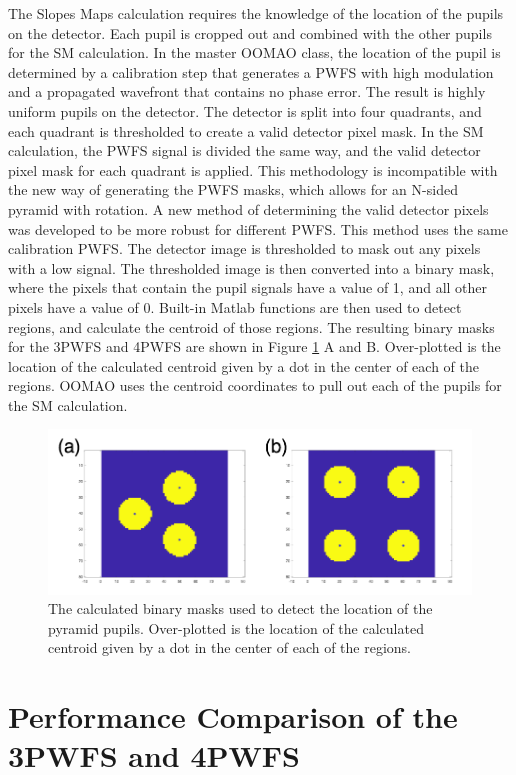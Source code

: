 The Slopes Maps calculation requires the knowledge of the location of the pupils on the detector. Each pupil is cropped out and combined with the other pupils for the SM calculation. In the master OOMAO class, the location of the pupil is determined by a calibration step that generates a PWFS with high modulation and a propagated wavefront that contains no phase error. The result is highly uniform pupils on the detector. The detector is split into four quadrants, and each quadrant is thresholded to create a valid detector pixel mask. In the SM calculation, the PWFS signal is divided the same way, and the valid detector pixel mask for each quadrant is applied. This methodology is incompatible with the new way of generating the PWFS masks, which allows for an N-sided pyramid with rotation. A new method of determining the valid detector pixels was developed to be more robust for different PWFS. This method uses the same calibration PWFS. The detector image is thresholded to mask out any pixels with a low signal. The thresholded image is then converted into a binary mask, where the pixels that contain the pupil signals have a value of 1, and all other pixels have a value of 0. Built-in Matlab functions are then used to detect regions, and calculate the centroid of those regions. The resulting binary masks for the 3PWFS and 4PWFS are shown in Figure \ref{fig:pyrcen} A and B. Over-plotted is the location of the calculated centroid given by a dot in the center of each of the regions. OOMAO uses the centroid coordinates to pull out each of the pupils for the SM calculation.

\begin{figure}
    \centering
    \includegraphics[width=.8\textwidth]{Chapter Materials/Chapter Four Materials/pyramidCenters.png}
    \caption{The calculated binary masks used to detect the location of the pyramid pupils. Over-plotted is the location of the calculated centroid given by a dot in the center of each of the regions.}
    \label{fig:pyrcen}
\end{figure}


\section{Performance Comparison of the 3PWFS and 4PWFS}
